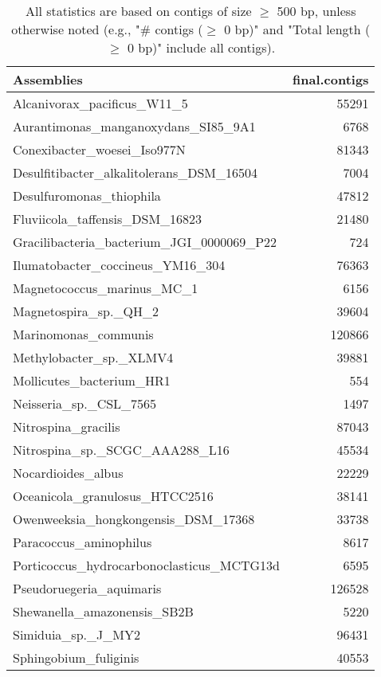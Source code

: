 \documentclass[12pt,a4paper]{article}
\begin{document}
\begin{table}[ht]
\begin{center}
\caption{All statistics are based on contigs of size $\geq$ 500 bp, unless otherwise noted (e.g., "\# contigs ($\geq$ 0 bp)" and "Total length ($\geq$ 0 bp)" include all contigs).}
\begin{tabular}{|l*{1}{|r}|}
\hline
Assemblies & final.contigs \\ \hline
Alcanivorax\_pacificus\_W11\_5 & 55291 \\ \hline
Aurantimonas\_manganoxydans\_SI85\_9A1 & 6768 \\ \hline
Conexibacter\_woesei\_Iso977N & 81343 \\ \hline
Desulfitibacter\_alkalitolerans\_DSM\_16504 & 7004 \\ \hline
Desulfuromonas\_thiophila & 47812 \\ \hline
Fluviicola\_taffensis\_DSM\_16823 & 21480 \\ \hline
Gracilibacteria\_bacterium\_JGI\_0000069\_P22 & 724 \\ \hline
Ilumatobacter\_coccineus\_YM16\_304 & 76363 \\ \hline
Magnetococcus\_marinus\_MC\_1 & 6156 \\ \hline
Magnetospira\_sp.\_QH\_2 & 39604 \\ \hline
Marinomonas\_communis & 120866 \\ \hline
Methylobacter\_sp.\_XLMV4 & 39881 \\ \hline
Mollicutes\_bacterium\_HR1 & 554 \\ \hline
Neisseria\_sp.\_CSL\_7565 & 1497 \\ \hline
Nitrospina\_gracilis & 87043 \\ \hline
Nitrospina\_sp.\_SCGC\_AAA288\_L16 & 45534 \\ \hline
Nocardioides\_albus & 22229 \\ \hline
Oceanicola\_granulosus\_HTCC2516 & 38141 \\ \hline
Owenweeksia\_hongkongensis\_DSM\_17368 & 33738 \\ \hline
Paracoccus\_aminophilus & 8617 \\ \hline
Porticoccus\_hydrocarbonoclasticus\_MCTG13d & 6595 \\ \hline
Pseudoruegeria\_aquimaris & 126528 \\ \hline
Shewanella\_amazonensis\_SB2B & 5220 \\ \hline
Simiduia\_sp.\_J\_MY2 & 96431 \\ \hline
Sphingobium\_fuliginis & 40553 \\ \hline

\end{tabular}
\end{center}
\end{table}
\end{document}
